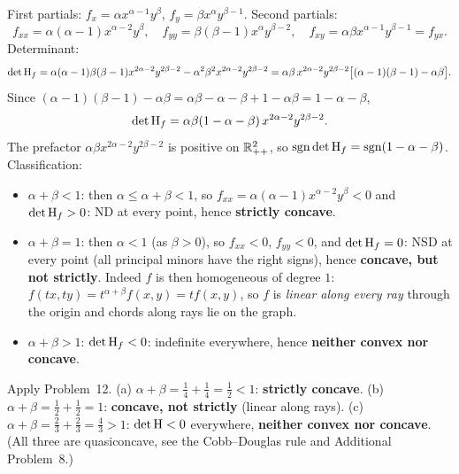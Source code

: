 \begin{solutions}
  \item First partials: $f_x=\alpha x^{\alpha-1}y^{\beta}$,
        $f_y=\beta x^{\alpha}y^{\beta-1}$. Second partials:
        \[
          f_{xx}=\alpha(\alpha-1)x^{\alpha-2}y^{\beta}, \quad
          f_{yy}=\beta(\beta-1)x^{\alpha}y^{\beta-2}, \quad
          f_{xy}=\alpha\beta x^{\alpha-1}y^{\beta-1}=f_{yx}.
        \]
        Determinant:
        \[
          \det\operatorname{H}_f
          = \alpha(\alpha-1)\beta(\beta-1)x^{2\alpha-2}y^{2\beta-2}
            -\alpha^{2}\beta^{2}x^{2\alpha-2}y^{2\beta-2}
          = \alpha\beta\,x^{2\alpha-2}y^{2\beta-2}
            \bigl[(\alpha-1)(\beta-1)-\alpha\beta\bigr].
        \]
        Since $(\alpha-1)(\beta-1)-\alpha\beta
        =\alpha\beta-\alpha-\beta+1-\alpha\beta=1-\alpha-\beta$,
        \[
          \det\operatorname{H}_f=\alpha\beta(1-\alpha-\beta)\,x^{2\alpha-2}y^{2\beta-2}.
        \]
        The prefactor $\alpha\beta x^{2\alpha-2}y^{2\beta-2}$ is positive
        on $\mathbb{R}^{2}_{++}$, so $\operatorname{sgn}\det\operatorname{H}_f=\operatorname{sgn}(1-\alpha-\beta)$.
        Classification:
        \begin{itemize}
          \item $\alpha+\beta<1$: then $\alpha\le\alpha+\beta<1$, so
                $f_{xx}=\alpha(\alpha-1)x^{\alpha-2}y^{\beta}<0$ and
                $\det\operatorname{H}_f>0$: ND at every point, hence
                \textbf{strictly concave}.
          \item $\alpha+\beta=1$: then $\alpha<1$ (as $\beta>0$), so
                $f_{xx}<0$, $f_{yy}<0$, and $\det\operatorname{H}_f=0$: NSD at every
                point (all principal minors have the right signs), hence
                \textbf{concave, but not strictly}. Indeed $f$ is then
                homogeneous of degree $1$:
                $f(tx,ty)=t^{\alpha+\beta}f(x,y)=tf(x,y)$, so $f$ is
                \emph{linear along every ray} through the origin and
                chords along rays lie on the graph.
          \item $\alpha+\beta>1$: $\det\operatorname{H}_f<0$: indefinite everywhere,
                hence \textbf{neither convex nor concave}.
        \end{itemize}

  \item Apply Problem~12. (a) $\alpha+\beta=\tfrac14+\tfrac14=\tfrac12<1$:
        \textbf{strictly concave}. \;
        (b) $\alpha+\beta=\tfrac12+\tfrac12=1$: \textbf{concave, not
        strictly} (linear along rays). \;
        (c) $\alpha+\beta=\tfrac23+\tfrac23=\tfrac43>1$: $\det\operatorname{H}<0$
        everywhere, \textbf{neither convex nor concave}. (All three are
        quasiconcave, see the Cobb--Douglas rule and Additional
        Problem~8.)


\end{solutions}
